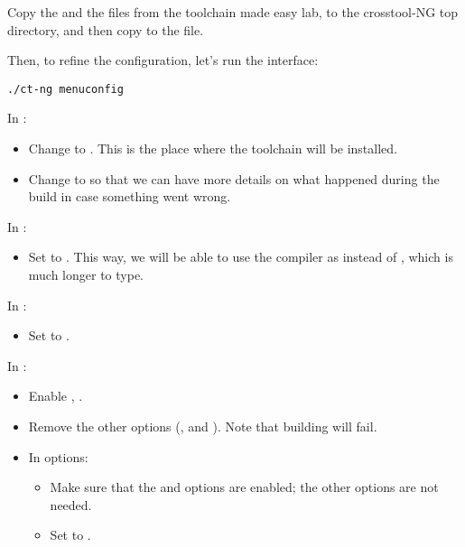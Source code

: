 Copy the  and the  files from the toolchain made easy lab, to the crosstool-NG top directory, and then copy  to the  file.

Then, to refine the configuration, let's run the  interface:

\begin{verbatim}
./ct-ng menuconfig
\end{verbatim}

In :

\begin{itemize}
\item Change  to
  . This is the place where
  the toolchain will be installed.
\item Change  to  so that we can have more
  details on what happened during the build in case something went wrong.
\end{itemize}

In :
\begin{itemize}
\item Set  to . This way, we will
  be able to use the compiler as  instead of
  , which is much longer to
  type.
\end{itemize}

In :
\begin{itemize}
\item Set  to .
\end{itemize}

In :
\begin{itemize}
\item Enable , .
\item Remove the other options (,  and ).
 Note that building  will fail.
\item In  options:
  \begin{itemize}
  \item Make sure that the  and 
	options are enabled; the other options are not needed.
  \item Set  to .
  \end{itemize}
\end{itemize}

